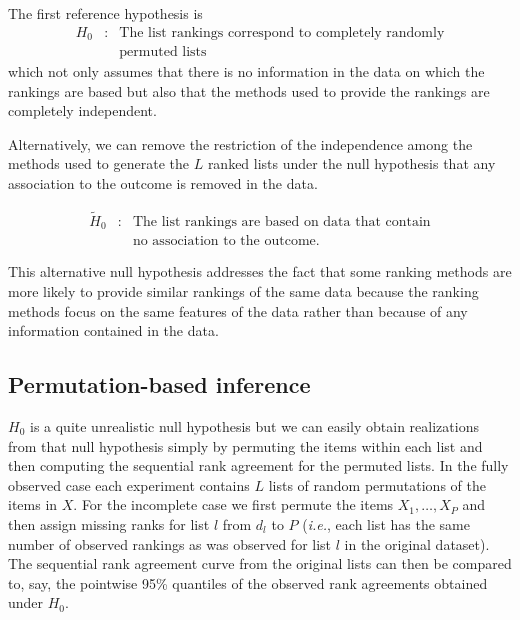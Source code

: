 \documentclass[oupdraft]{bio}
\makeatletter
\newcommand{\ie}{\emph{i.e.}\@\xspace}
\newcommand{\nn}{\nonumber}
\makeatother
\begin{document}
The first reference hypothesis is
\begin{eqnarray}
H_0  & : &  \text{The list rankings correspond to completely randomly}\label{eq:permutationHypothesis}\\
       &  & \text{permuted lists}\nn
\end{eqnarray}
which not only assumes that there is no information in the data on
which the rankings are based but also that the methods used to provide
the rankings are completely independent.

Alternatively, we can remove the restriction of the independence among
the methods used to generate the $L$ ranked lists under the null
hypothesis that any association to the outcome is removed in the
data.


\begin{eqnarray*}
\widetilde H_0 & :&  \text{The list rankings are based on data that contain}\\
& &   \text{no association to the outcome.}
\end{eqnarray*}

This alternative null hypothesis addresses the fact that some ranking
methods are more likely to provide similar rankings of the same data
because the ranking methods focus on the same features of the data
rather than because of any information contained in the data.


\subsection{Permutation-based inference}

$H_0$ is a quite unrealistic null hypothesis but we can easily obtain
realizations from that null hypothesis simply by permuting the items
within each list and then computing the sequential rank agreement for
the permuted lists. In the fully observed case each experiment
contains $L$ lists of random permutations of the items in $X$. For the
incomplete case we first permute the items $X_1,\dots,X_P$ and then assign missing ranks
for list $l$ from  $d_l$ to $P$ (\ie, each list has the same number of
observed rankings as was observed for list $l$ in the original
dataset). The sequential rank agreement curve from the original
lists can then be compared to, say, the pointwise 95\% quantiles of
the observed rank agreements obtained under $H_0$.
\end{document}
